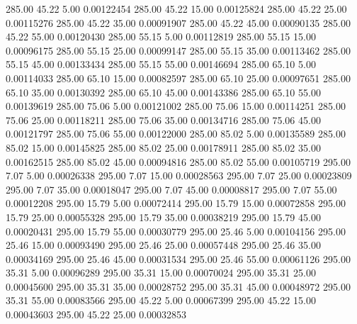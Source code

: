     285.00     45.22      5.00     0.00122454
    285.00     45.22     15.00     0.00125824
    285.00     45.22     25.00     0.00115276
    285.00     45.22     35.00     0.00091907
    285.00     45.22     45.00     0.00090135
    285.00     45.22     55.00     0.00120430
    285.00     55.15      5.00     0.00112819
    285.00     55.15     15.00     0.00096175
    285.00     55.15     25.00     0.00099147
    285.00     55.15     35.00     0.00113462
    285.00     55.15     45.00     0.00133434
    285.00     55.15     55.00     0.00146694
    285.00     65.10      5.00     0.00114033
    285.00     65.10     15.00     0.00082597
    285.00     65.10     25.00     0.00097651
    285.00     65.10     35.00     0.00130392
    285.00     65.10     45.00     0.00143386
    285.00     65.10     55.00     0.00139619
    285.00     75.06      5.00     0.00121002
    285.00     75.06     15.00     0.00114251
    285.00     75.06     25.00     0.00118211
    285.00     75.06     35.00     0.00134716
    285.00     75.06     45.00     0.00121797
    285.00     75.06     55.00     0.00122000
    285.00     85.02      5.00     0.00135589
    285.00     85.02     15.00     0.00145825
    285.00     85.02     25.00     0.00178911
    285.00     85.02     35.00     0.00162515
    285.00     85.02     45.00     0.00094816
    285.00     85.02     55.00     0.00105719
    295.00      7.07      5.00     0.00026338
    295.00      7.07     15.00     0.00028563
    295.00      7.07     25.00     0.00023809
    295.00      7.07     35.00     0.00018047
    295.00      7.07     45.00     0.00008817
    295.00      7.07     55.00     0.00012208
    295.00     15.79      5.00     0.00072414
    295.00     15.79     15.00     0.00072858
    295.00     15.79     25.00     0.00055328
    295.00     15.79     35.00     0.00038219
    295.00     15.79     45.00     0.00020431
    295.00     15.79     55.00     0.00030779
    295.00     25.46      5.00     0.00104156
    295.00     25.46     15.00     0.00093490
    295.00     25.46     25.00     0.00057448
    295.00     25.46     35.00     0.00034169
    295.00     25.46     45.00     0.00031534
    295.00     25.46     55.00     0.00061126
    295.00     35.31      5.00     0.00096289
    295.00     35.31     15.00     0.00070024
    295.00     35.31     25.00     0.00045600
    295.00     35.31     35.00     0.00028752
    295.00     35.31     45.00     0.00048972
    295.00     35.31     55.00     0.00083566
    295.00     45.22      5.00     0.00067399
    295.00     45.22     15.00     0.00043603
    295.00     45.22     25.00     0.00032853
